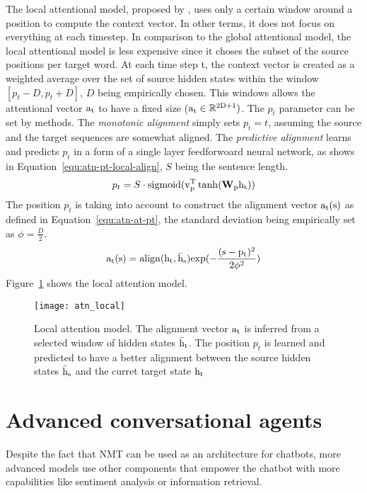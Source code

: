 The local attentional model, proposed by \citet{1508.04025}, uses only a certain window around a position to compute the context vector. In other terms, it does not focus on everything at each timestep. In comparison to the global attentional model, the local attentional model is less expensive since it choses the subset of the source positions per target word. At each time step t, the context vector is created as a weighted average over the set of source hidden states within the window $[p_t - D, p_t + D]$, $D$ being empirically chosen.
This windows allows the attentional vector $\rm{a}_t$ to have a fixed size ($\rm{a}_t \in \mathbb{R}^{2D+1})$. The $p_t$ parameter can be set by methods. The \textit{monotonic alignment} simply sets $p_t = t$, assuming the source and the target sequences are somewhat aligned. The \textit{predictive alignment} learns and predicts $p_t$ in a form of a single layer feedforwoard neural network, as shows in Equation~\ref{equ:atn-pt-local-align}, $S$ being the sentence length.
\begin{equation}
    p_t = S \cdot \mathrm{sigmoid} ( \rm{v}_p^T \tanh ( \mathbf{W}_p \rm{h}_t))
    \label{equ:atn-pt-local-align}
\end{equation}
The position $p_t$ is taking into account to construct the alignment vector $\rm{a}_t(s)$ as defined in Equation~\ref{equ:atn-at-pt}, the standard deviation being empirically set as $\phi = \frac{D}{2}$.
\begin{equation}
    \rm{a}_t(s) = \mathrm{align}(\rm{h}_t, \rm{\bar{h}}_s) \mathrm{exp}(- \frac{(s - p_t)^2}{2\phi^2})
    \label{equ:atn-at-pt}
\end{equation}
Figure~\ref{fig:atn-local} shows the local attention model.
\begin{figure}
    \centering
    \texttt{[image: atn\_local]}
    \caption[Local attention model]{Local attention model. The alignment vector $\rm{a}_t$ is inferred from a selected window of hidden states $\rm{\bar{h}}_t$. The position $p_t$ is learned and predicted to have a better alignment between the source hidden states $\rm{\bar{h}}_s$ and the curret target state $\rm{h}_t$}
    \label{fig:atn-local}
\end{figure}

\section{Advanced conversational agents}
Despite the fact that NMT can be used as an architecture for chatbots, more advanced models use other components that empower the chatbot with more capabilities like sentiment analysis or information retrieval.

